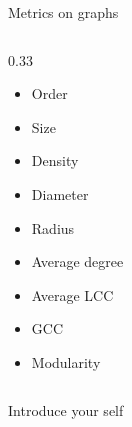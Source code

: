 \begin{frame}{Metrics on graphs}
\begin{columns}[t]
\begin{column}{0.33\textwidth}
\begin{itemize}
\begin{itemize}
                        \item Order
                        \item Size
                        \item Density
                        \item Diameter
                        \item Radius
                        \item Average degree
                        \item Average LCC
                        \item GCC
                        \item Modularity
                    \end{itemize}
                \end{itemize}
            \end{column}
        \end{columns}

        \begin{note}
            {Introduce your self}
        \end{note}
    \end{frame}

